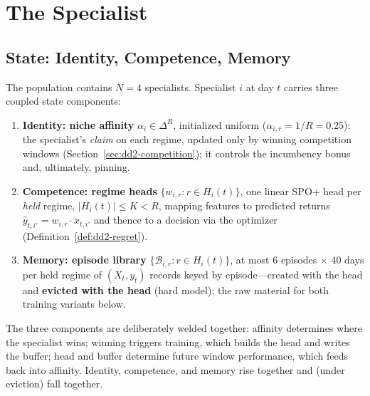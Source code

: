 \section{The Specialist}
\label{sec:dd2-specialist}

\subsection{State: Identity, Competence, Memory}

\begin{definition}
\label{def:dd2-specialist}
The population contains $N = 4$ specialists. Specialist $i$ at day $t$
carries three coupled state components:
\begin{enumerate}
  \item \textbf{Identity: niche affinity} $\alpha_i \in \Delta^{R}$,
        initialized uniform ($\alpha_{i,r} = 1/R = 0.25$): the specialist's
        \emph{claim} on each regime, updated only by winning competition
        windows (Section~\ref{sec:dd2-competition}); it controls the
        incumbency bonus and, ultimately, pinning.
  \item \textbf{Competence: regime heads} $\{w_{i,r} : r \in H_i(t)\}$, one
        linear SPO+ head per \emph{held} regime, $|H_i(t)| \le K < R$,
        mapping features to predicted returns
        $\hat y_{t,i'} = w_{i,r} \cdot x_{t,i'}$ and thence to a decision
        via the optimizer (Definition~\ref{def:dd2-regret}).
  \item \textbf{Memory: episode library}
        $\{\mathcal{B}_{i,r} : r \in H_i(t)\}$, at most $6$ episodes
        $\times$ $40$ days per held regime of $(X_t, y_t)$ records keyed by
        episode---created with the head and \textbf{evicted with the head}
        (hard model); the raw material for both training variants below.
\end{enumerate}
\end{definition}

The three components are deliberately welded together: affinity determines
where the specialist wins; winning triggers training, which builds the head
and writes the buffer; head and buffer determine future window performance,
which feeds back into affinity. Identity, competence, and memory rise
together and (under eviction) fall together.


